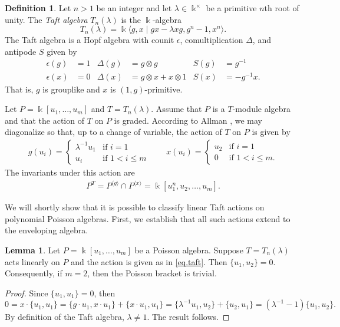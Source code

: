 \documentclass[reqno]{amsart}
\numberwithin{equation}{section}
\theoremstyle{definition}
\newtheorem{definition}[theorem]{Definition}
\newtheorem{lemma}[theorem]{Lemma}
\newcommand\inv{^{-1}}
\newcommand\tensor{\otimes}
\newcommand\kk{\Bbbk}
\newcommand\grp[1]{\langle #1 \rangle}
\begin{document}
\begin{definition}\label{defn.taft}
Let $n>1$ be an integer and let 
$\lambda \in \kk^\times$ be a primitive $n$th root of unity.
The \emph{Taft algebra} $T_n(\lambda)$ is the $\kk$-algebra
\[ T_n(\lambda) = \kk\langle g,x \mid gx-\lambda xg, g^n-1, x^n \rangle.\]
The Taft algebra is a Hopf algebra with counit $\epsilon$, comultiplication $\Delta$, and antipode $S$ given by
\begin{align*}
    \epsilon(g) &= 1    &   \Delta(g) &= g \tensor g & S(g) &= g\inv \\
    \epsilon(x) &= 0    &   \Delta(x) &= g \tensor x + x\tensor 1 & S(x) &= -g\inv x.
\end{align*}
That is, $g$ is grouplike and $x$ is $(1,g)$-primitive.
\end{definition}

Let $P=\kk[u_1,\hdots,u_m]$ and $T=T_n(\lambda)$. Assume that $P$ is a $T$-module algebra and that the action of $T$ on $P$ is graded. According to Allman \cite{All}, we may diagonalize so that, up to a change of variable, the action of $T$ on $P$ is given by 
\begin{align}\label{eq.taft}
g(u_i) = \begin{cases}
    \lambda\inv u_1 & \text{if $i=1$} \\
    u_i & \text{if $1 < i \leq m$}
\end{cases} \qquad
x(u_i) = \begin{cases}
    u_2 & \text{if $i=1$} \\
    0 & \text{if $1 < i \leq m$}.
\end{cases}
\end{align}
The invariants under this action are
\begin{align}\label{eq.Taft_inv}
P^T = P^{\grp{g}} \cap P^{\grp{x}} = \kk[u_1^n,u_2,\hdots,u_m].
\end{align}

We will shortly show that it is possible to classify linear Taft actions on polynomial Poisson algebras. First, we establish that all such actions extend to the enveloping algebra.

\begin{lemma}\label{lem.taft1}
Let $P=\kk[u_1,\hdots,u_m]$ be a Poisson algebra. Suppose $T=T_n(\lambda)$ acts linearly on $P$ and the action is given as in \eqref{eq.taft}. Then $\{u_1,u_2\}=0$. Consequently, if $m=2$, then the Poisson bracket is trivial.
\end{lemma}
\begin{proof}
Since $\{u_1,u_1\}=0$, then
\[ 0 = x \cdot \{u_1,u_1\} = \{g\cdot u_1,x \cdot u_1 \} + \{x \cdot u_1,u_1\} = \{ \lambda\inv u_1,u_2\} + \{u_2,u_1\} = (\lambda\inv-1)\{u_1,u_2\}.\]
By definition of the Taft algebra, $\lambda \neq 1$. 
The result follows.
\end{proof}
\end{document}
